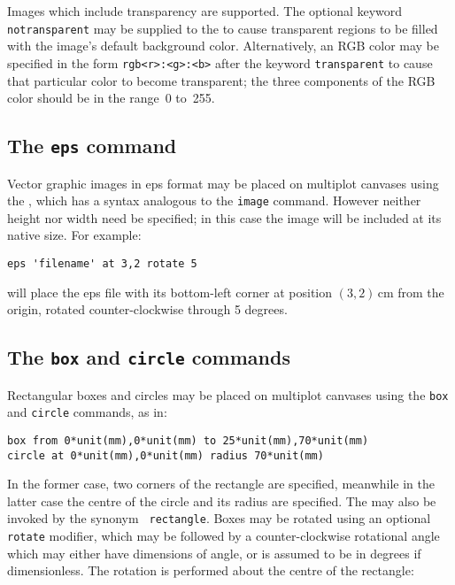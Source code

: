 Images which include transparency are supported. The optional keyword {\tt
notransparent} may be supplied to the  to cause transparent
regions to be filled with the image's default background color. Alternatively,
an RGB color may be specified in the form {\tt rgb<r>:<g>:<b>} after the
keyword {\tt transparent} to cause that particular color to become
transparent; the three components of the RGB color should be in the range~0
to~255.

\subsection{The {\tt eps} command}

Vector graphic images in eps format may be placed on multiplot canvases
using the , which has a syntax analogous to the {\tt image}
command.  However neither height nor width need be specified; in this case the
image will be included at its native size.  For example:

\begin{verbatim}
eps 'filename' at 3,2 rotate 5
\end{verbatim}

\noindent will place the eps file with its bottom-left corner at position
$(3,2)$\,cm from the origin, rotated counter-clockwise through 5 degrees.

\subsection{The {\tt box} and {\tt circle} commands}
\label{sec:rectangle}

Rectangular boxes and circles may be placed on multiplot canvases
using the {\tt box} and {\tt circle} commands, as
in:

\begin{verbatim}
box from 0*unit(mm),0*unit(mm) to 25*unit(mm),70*unit(mm)
circle at 0*unit(mm),0*unit(mm) radius 70*unit(mm)
\end{verbatim}

\noindent In the former case, two corners of the rectangle are specified,
meanwhile in the latter case the centre of the circle and its radius are
specified. The  may also be invoked by the synonym {\tt
rectangle}. Boxes may be rotated using an optional {\tt
rotate} modifier, which may be followed by a counter-clockwise rotational angle
which may either have dimensions of angle, or is assumed to be in degrees if
dimensionless. The rotation is performed about the centre of the rectangle:

